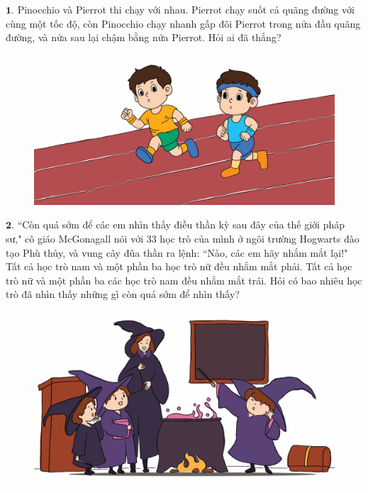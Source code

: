\begin{multicols}{2}
	$\pmb{1.}$	Pinocchio và Pierrot thi chạy với nhau. Pierrot chạy suốt cả quãng đường với cùng một tốc độ, còn Pinocchio chạy nhanh gấp đôi Pierrot trong nửa đầu quãng đường, và nửa sau lại chậm bằng nửa Pierrot. Hỏi ai đã thắng?
	\begin{figure}[H]
		\centering
		\vspace*{-5pt}
		\captionsetup{labelformat= empty, justification=centering}
		\includegraphics[width=1\linewidth]{Pi4_bai1}
		\vspace*{-15pt}
	\end{figure}
	$\pmb{2.}$ ``Còn quá sớm để các em nhìn thấy điều thần kỳ sau đây của thế giới pháp sư," cô giáo McGonagall  nói với $33$ học trò của mình ở ngôi trường Hogwarts đào tạo Phù thủy, và vung cây đũa thần ra lệnh: ``Nào, các em hãy nhắm mắt lại!" Tất cả học trò nam và một phần ba học trò nữ đều nhắm mắt phải. Tất cả học trò nữ và một phần ba các học trò nam đều nhắm mắt trái. Hỏi có bao nhiêu học trò đã nhìn thấy những gì còn quá sớm để nhìn thấy?
	\begin{figure}[H]
		\centering
		\vspace*{-10pt}
		\captionsetup{labelformat= empty, justification=centering}
		\includegraphics[width=1\linewidth]{Pi4_bai2}

\end{figure}
\end{multicols}
